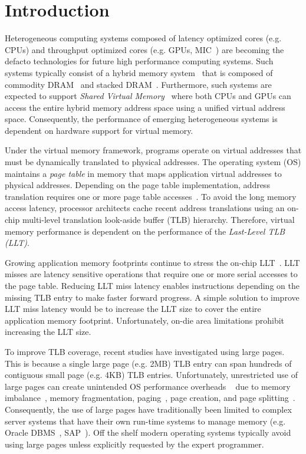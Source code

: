 
\section{Introduction}

\noindent Heterogeneous computing systems composed of latency
optimized cores (e.g. CPUs) and throughput optimized cores (e.g. GPUs,
MIC~\cite{MIC}) are becoming the defacto technologies for future high
performance computing systems. Such systems typically consist of a
hybrid memory system~\cite{hbm_intel,hbm_amd,hbm_nvidia} that is
composed of commodity DRAM~\cite{ddr4-spec} and stacked
DRAM~\cite{hbm-spec,hmc_spec}. Furthermore, such systems are expected
to support {\em Shared Virtual Memory}~\cite{HSA,UVM} where both CPUs
and GPUs can access the entire hybrid memory address space using a
unified virtual address space. Consequently, the performance of
emerging heterogeneous systems is dependent on hardware support for
virtual memory.%

Under the virtual memory framework, programs operate on virtual
addresses that must be dynamically translated to physical addresses.
The operating system (OS) maintains a {\em page table} in memory that
maps application virtual addresses to physical addresses. Depending on
the page table implementation, address translation requires one or
more page table accesses~\cite{Bhargava2008}. To avoid the long memory
access latency, processor architects cache recent address translations
using an on-chip multi-level translation look-aside buffer (TLB)
hierarchy. Therefore, virtual memory performance is dependent on the
performance of the {\em Last-Level TLB (LLT)}.

Growing application memory footprints continue to stress the on-chip
LLT~\cite{spectlb, Basu2013, SharedLLT, COLT}. LLT misses are latency
sensitive operations that require one or more serial accesses to the
page table. Reducing LLT miss latency enables instructions depending
on the missing TLB entry to make faster forward progress. A simple
solution to improve LLT miss latency would be to increase the LLT size
to cover the entire application memory footprint. Unfortunately,
on-die area limitations prohibit increasing the LLT size.

To improve TLB coverage, recent studies have investigated using large
pages. This is because a single large page (e.g. 2MB) TLB entry can
span hundreds of contiguous small page (e.g. 4KB) TLB entries.
Unfortunately, unrestricted use of large pages can create unintended
OS performance overheads ~\cite{SuperPageProblem, TwoPageSize} due to
memory imbalance~\cite{numa-harmful}, memory fragmentation,
paging~\cite{cameo}, page creation, and page
splitting~\cite{largepagevm}. Consequently, the use of large pages
have traditionally been limited to complex server systems that have
their own run-time systems to manage memory (e.g. Oracle
DBMS~\cite{oracle_dbms}, SAP~\cite{sap}). Off the shelf modern
operating systems typically avoid using large pages unless explicitly
requested by the expert programmer.

